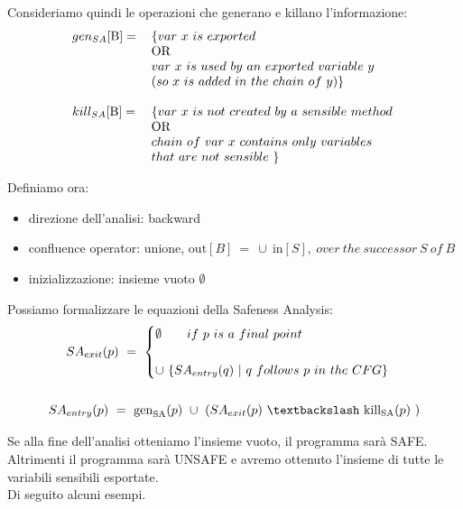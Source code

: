 \documentclass[letterpaper,twocolumn,10pt]{article}
\begin{document}
Consideriamo quindi le operazioni che generano e killano l'informazione:\\
\begin{align*}
\begin{tabular}{  l l }
	$ gen_{SA}[\text{B}]= $ & $ \{ var\ x\ is\ exported $\\ 
	& OR \\
	& $ var\ x\ is\ used\ by\ an\ exported\ variable\ y\ $\\ 
	& $ ( so\ x\ is\ added\ in\ the\ chain\ of\ y ) \} $ \\
	& \\                  
	$  kill_{SA}[\text{B}]= $ & $ \{ var\ x\ is\ not\ created\ by\ a\ sensible\ method\ $\\
    & OR \\ 
    & $ chain\ of\ var\ x\ contains\ only\ variables\ $ \\
    & $ that\ are\ not\ sensible\ \} $ \\
\end{tabular}
\end{align*}

Definiamo ora: 
\begin{itemize}
\item direzione dell'analisi: backward
\item confluence operator: unione, $ \text{out}[B]\ =\ \cup\ \text{in}[S],\ over\ the\ successor\ S\ of\ B\  $
\item inizializzazione: insieme vuoto $ \emptyset $
\end{itemize}

Possiamo formalizzare le equazioni della Safeness Analysis:
\begin{gather*}
SA_\textrm{$exit$}(p)\ =\ 
\begin{cases}
\emptyset\qquad if\ p\ is\ a\ final\ point\ \\ \\
\cup\ \lbrace SA_\textrm{$entry$}(q)\ |\ q\ follows\ p\ in\ the\ CFG \rbrace 
\end{cases} \\ \\
SA_\textrm{$entry$}(p)\ =\ \text{gen}_\textrm{SA}(p)\ \cup\ (SA_\textrm{$exit$}(p)\ \textbackslash\ \text{kill}_\textrm{SA}(p)\ )
\end{gather*}

Se alla fine dell'analisi otteniamo l'insieme vuoto, il programma sar\`a SAFE. Altrimenti il programma sar\`a UNSAFE e avremo ottenuto l'insieme di tutte le variabili sensibili esportate.\\
Di seguito alcuni esempi.\\
\end{document}
